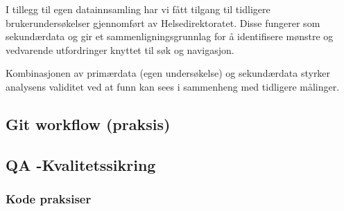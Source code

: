 I tillegg til egen datainnsamling har vi fått tilgang til tidligere brukerundersøkelser gjennomført av Helsedirektoratet. Disse fungerer som sekundærdata og gir et sammenligningsgrunnlag for å identifisere mønstre og vedvarende utfordringer knyttet til søk og navigasjon.

Kombinasjonen av primærdata (egen undersøkelse) og sekundærdata styrker analysens validitet ved at funn kan sees i sammenheng med tidligere målinger.


\subsection{Git workflow (praksis)}
\subsection{QA -Kvalitetssikring}
\subsubsection{Kode praksiser}